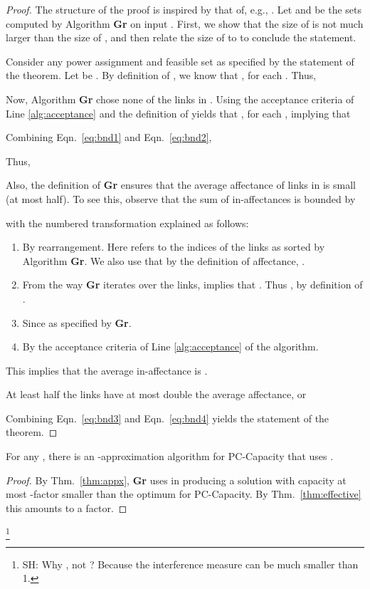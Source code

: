 \documentclass[11pt]{amsart}
\newcommand{\prob}[1]{\textsf{#1}}  \newcommand{\alg}[1]{\textbf{#1}}
\begin{document}
\begin{proof}
The structure of the proof is inspired by that of, e.g., \cite{KesselheimSoda11}. 
Let  and  be the sets computed by Algorithm \alg{Gr} on input . 
First, we show that the size of  is not much larger than the size of , and then relate the size of  to  to conclude the statement.   


Consider any power assignment  and feasible set  as specified by the statement of the theorem.
Let  be .
By definition of , we know that  , for each . Thus, 

Now, Algorithm \alg{Gr} chose none of the links in . Using the acceptance criteria of Line \ref{alg:acceptance}  and the definition of  yields that 
, for each , implying that

Combining Eqn.\ \ref{eq:bnd1} and Eqn.\ \ref{eq:bnd2},

Thus,

Also, the definition of \alg{Gr} ensures that the average affectance
of links in  is small (at most half). To see this, observe that
the sum of in-affectances is bounded by

with the numbered transformation explained as follows:
\begin{enumerate}
\item By rearrangement. Here  refers to the indices of the links as sorted by Algorithm \alg{Gr}. We also use that by the definition of affectance, .
\item From the way \alg{Gr} iterates over the links,  implies that . Thus  , by definition of .
\item Since  as specified by \alg{Gr}.
\item By the acceptance criteria of Line \ref{alg:acceptance} of the algorithm.
\end{enumerate}
This implies that the average in-affectance is . 

At least half the links have at most double the average
affectance, or

Combining Eqn.\ \ref{eq:bnd3} and Eqn.\ \ref{eq:bnd4} yields the statement of the theorem.
\end{proof}



\begin{theorem}
For any , there is an 
-approximation algorithm for 
\prob{PC-Capacity} that uses .
\label{thm:appxpc}
\end{theorem}
\begin{proof}
By Thm.~\ref{thm:appx}, {\alg{Gr}} uses  in producing a solution with capacity at most -factor smaller than the optimum for \prob{PC-Capacity}. By Thm.~\ref{thm:effective} this amounts to a  factor.
\end{proof}
\footnote{SH: Why , not ?
Because the interference measure can be much smaller than 1.}
\end{document}
